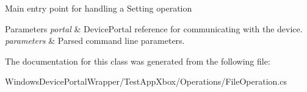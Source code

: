 Main entry point for handling a Setting operation 


\begin{DoxyParams}{Parameters}
{\em portal} & Device\+Portal reference for communicating with the device.\\
\hline
{\em parameters} & Parsed command line parameters.\\
\hline
\end{DoxyParams}


The documentation for this class was generated from the following file\+:\begin{DoxyCompactItemize}
\item 
Windows\+Device\+Portal\+Wrapper/\+Test\+App\+Xbox/\+Operations/File\+Operation.\+cs\end{DoxyCompactItemize}
